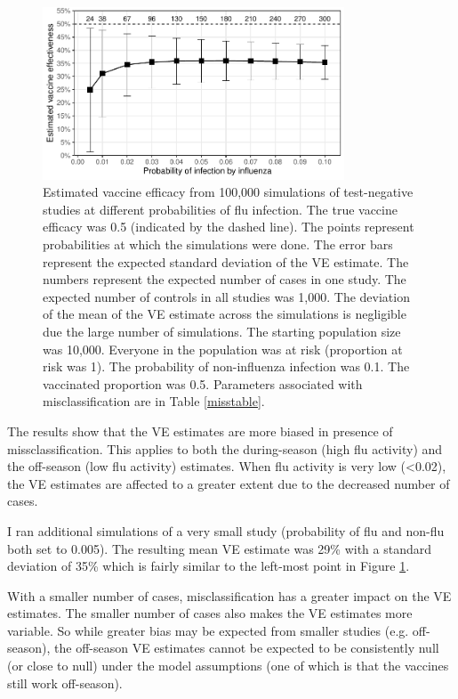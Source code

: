 \documentclass[12pt]{article}
\begin{document}
\begin{figure}[htp]
	\centering
	\includegraphics[width=0.8\textwidth]{../graph/pflu-miss.pdf}
	\caption{
	Estimated vaccine efficacy from 100,000 simulations of test-negative studies at different probabilities of flu infection. The true vaccine efficacy was 0.5 (indicated by the dashed line). The points represent probabilities at which the simulations were done. The error bars represent the expected standard deviation of the VE estimate. The numbers represent the expected number of cases in one study. The expected number of controls in all studies was 1,000. The deviation of the mean of the VE estimate across the simulations is negligible due the large number of simulations. The starting population size was 10,000. Everyone in the population was at risk (proportion at risk was 1). The probability of non-influenza infection was 0.1. The vaccinated proportion was 0.5. Parameters associated with misclassification are in Table \ref{misstable}.
	}
	\label{pflumiss}
\end{figure}

\pagebreak

The results show that the VE estimates are more biased in presence of missclassification. This applies to both the during-season (high flu activity) and the off-season (low flu activity) estimates. When flu activity is very low (<0.02), the VE estimates are affected to a greater extent due to the decreased number of cases. 

I ran additional simulations of a very small study (probability of flu and non-flu both set to 0.005). The resulting mean VE estimate was 29\% with a standard deviation of 35\% which is fairly similar to the left-most point in Figure \ref{pflumiss}.

With a smaller number of cases, misclassification has a greater impact on the VE estimates. The smaller number of cases also makes the VE estimates more variable. So while greater bias may be expected from smaller studies (e.g. off-season), the off-season VE estimates cannot be expected to be consistently null (or close to null) under the model assumptions (one of which is that the vaccines still work off-season).
\end{document}
